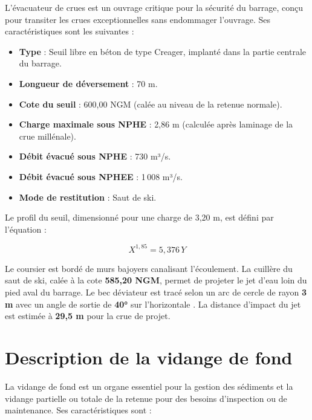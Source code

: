 L'évacuateur de crues est un ouvrage critique pour la sécurité du barrage, conçu pour transiter les crues exceptionnelles sans endommager l'ouvrage. Ses caractéristiques sont les suivantes \cite{fiche_synoptique, note_calcul_evacuateur} :

\begin{itemize}
    \item \textbf{Type} : Seuil libre en béton de type Creager, implanté dans la partie centrale du barrage.
    \item \textbf{Longueur de déversement} : 70 m.
    \item \textbf{Cote du seuil} : 600,00 NGM (calée au niveau de la retenue normale).
    \item \textbf{Charge maximale sous NPHE} : 2,86 m (calculée après laminage de la crue millénale).
    \item \textbf{Débit évacué sous NPHE} : 730 m³/s.
    \item \textbf{Débit évacué sous NPHEE} : 1\,008 m³/s.
    \item \textbf{Mode de restitution} : Saut de ski.
\end{itemize}

Le profil du seuil, dimensionné pour une charge de 3,20 m, est défini par l'équation \cite{note_calcul_evacuateur} :

\begin{equation}
X^{1,85} = 5{,}376\,Y
\label{eq:profil_creager}
\end{equation}

Le coursier est bordé de murs bajoyers canalisant l'écoulement. La cuillère du saut de ski, calée à la cote \textbf{585,20 NGM}, permet de projeter le jet d'eau loin du pied aval du barrage. Le bec déviateur est tracé selon un arc de cercle de rayon \textbf{3 m} avec un angle de sortie de \textbf{40°} sur l'horizontale \cite{note_calcul_evacuateur}. La distance d'impact du jet est estimée à \textbf{29,5 m} pour la crue de projet.

\section{Description de la vidange de fond}
\label{sec:vidange_fond}

La vidange de fond est un organe essentiel pour la gestion des sédiments et la vidange partielle ou totale de la retenue pour des besoins d'inspection ou de maintenance. Ses caractéristiques sont \cite{fiche_organes_restitution, note_calcul_vidange} :

